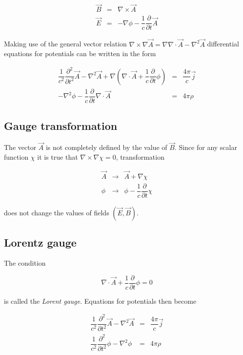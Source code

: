 \documentclass{article}
\begin{document}
\begin{eqnarray*}
\vec{B} & = & \nabla \times \vec{A} \\
\vec{E} & = & - \nabla \phi - \dfrac{1}{c} \dfrac{\partial}{\partial t} \vec{A}
\end{eqnarray*}

Making use of the general vector relation $\nabla \times \nabla \vec{A} = \nabla \nabla \cdot \vec{A} - \nabla^2 \vec{A}$ differential equations for potentials can be written in the form

\begin{eqnarray*}
\dfrac{1}{c^2} \dfrac{\partial^2}{\partial t^2} \vec{A} - \nabla^2 \vec{A} + \nabla \left( \nabla \cdot \vec{A} + \dfrac{1}{c} \dfrac{\partial}{\partial t} \phi \right) & = & \dfrac{4 \pi}{c} \vec{j} \\
-\nabla^2 \phi - \dfrac{1}{c} \dfrac{\partial}{\partial t} \nabla \cdot \vec{A} & = & 4 \pi \rho
\end{eqnarray*}

\subsection{Gauge transformation}

The vector $\vec{A}$ is not completely defined by the value of $\vec{B}$. Since for any scalar function $\chi$ it is true that $\nabla \times \nabla \chi = 0$, transformation

\begin{eqnarray*}
\vec{A} & \rightarrow & \vec{A} + \nabla \chi \\
\phi & \rightarrow & \phi - \dfrac{1}{c} \dfrac{\partial}{\partial t} \chi
\end{eqnarray*}

does not change the values of fields $\left( \vec{E}, \vec{B} \right)$.

\subsection{Lorentz gauge}

The condition

\begin{equation*}
\nabla \cdot \vec{A} + \dfrac{1}{c} \dfrac{\partial}{\partial t} \phi = 0
\end{equation*}

is called the \textit{Lorent gauge}. Equations for potentials then become

\begin{eqnarray*}
\dfrac{1}{c^2} \dfrac{\partial^2}{\partial t^2} \vec{A} - \nabla^2 \vec{A} & = & \dfrac{4 \pi}{c} \vec{j} \\
\dfrac{1}{c^2} \dfrac{\partial^2}{\partial t^2} \phi - \nabla^2 \phi & = & 4 \pi \rho
\end{eqnarray*}
\end{document}
